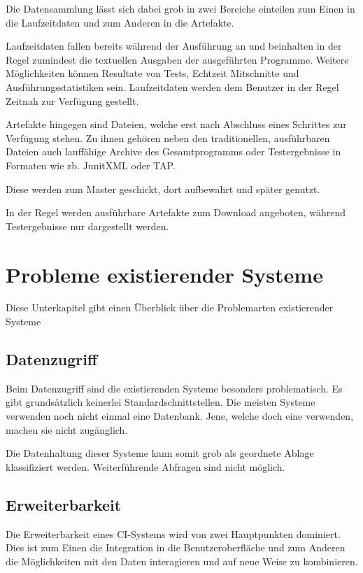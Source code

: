 Die Datensammlung lässt sich dabei grob in zwei Bereiche einteilen
zum Einen in die Laufzeitdaten und zum Anderen in die Artefakte.

Laufzeitdaten fallen bereits w\"ahrend der Ausf\"uhrung an
und beinhalten in der Regel zumindest die textuellen Ausgaben
der ausgef\"uhrten Programme.
Weitere M\"oglichkeiten k\"onnen Resultate von Tests, Echtzeit Mitschnitte und Ausführungsstatistiken sein.
Laufzeitdaten werden dem Benutzer in der Regel Zeitnah zur Verfügung gestellt.

Artefakte hingegen sind Dateien,
welche erst nach Abschluss eines Schrittes zur Verfügung stehen.
Zu ihnen geh\"oren neben den traditionellen, ausf\"uhrbaren Dateien
auch lauff\"ahige Archive des Gesamtprogramms oder Testergebnisse in Formaten wie zb. JunitXML \cite{jenkins:junitxml} oder \ac{TAP}.


Diese werden zum Master geschickt, dort aufbewahrt und sp\"ater genutzt.

In der Regel werden ausf\"uhrbare Artefakte zum Download angeboten,
w\"ahrend Testergebnisse nur dargestellt werden.


\section{Probleme existierender Systeme}

Diese Unterkapitel gibt einen \"Uberblick \"uber die Problemarten existierender Systeme

\subsection{Datenzugriff}

Beim Datenzugriff sind die existierenden Systeme besonders problematisch.
Es gibt grundsätzlich keinerlei Standardschnittstellen.
Die meisten Systeme verwenden noch nicht einmal eine Datenbank.
Jene, welche doch eine verwenden, machen sie nicht zugänglich.

Die Datenhaltung dieser Systeme kann somit grob als geordnete Ablage klassifiziert werden.
Weiterführende Abfragen sind nicht möglich.

\subsection{Erweiterbarkeit}

Die Erweiterbarkeit eines \ac{CI}-Systems wird von zwei Hauptpunkten dominiert.
Dies ist zum Einen die Integration in die Benutzeroberfl\"ache
und zum Anderen die Möglichkeiten mit den Daten interagieren
und auf neue Weise zu kombinieren.

